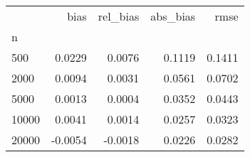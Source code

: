 \begin{tabular}{lrrrr}
\toprule
{} &    bias &  rel\_bias &  abs\_bias &   rmse \\
n     &         &           &           &        \\
\midrule
500   &  0.0229 &    0.0076 &    0.1119 & 0.1411 \\
2000  &  0.0094 &    0.0031 &    0.0561 & 0.0702 \\
5000  &  0.0013 &    0.0004 &    0.0352 & 0.0443 \\
10000 &  0.0041 &    0.0014 &    0.0257 & 0.0323 \\
20000 & -0.0054 &   -0.0018 &    0.0226 & 0.0282 \\
\bottomrule
\end{tabular}
